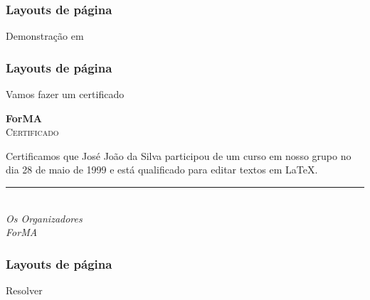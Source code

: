 \begin{frame}
  \frametitle{Layouts de página}
  \huge
  Demonstração em 
\end{frame}

\begin{frame}
  \frametitle{Layouts de página}
  \huge
  Vamos fazer um certificado
\end{frame}

\begin{frame}[plain]

  {\huge\textbf{ForMA}}\\[2em]
  {\LARGE\textsc{Certificado}}

  \noindent Certificamos que José João da Silva participou de um curso em nosso
  grupo no dia 28 de maio de 1999 e está qualificado para editar textos em
  \LaTeX.

  \vfill
  \rule{}{.4pt}\\
  \emph{Os Organizadores}\\
  \emph{ForMA}

\end{frame}

\begin{frame}
  \frametitle{Layouts de página}
  \huge
  Resolver 
\end{frame}
